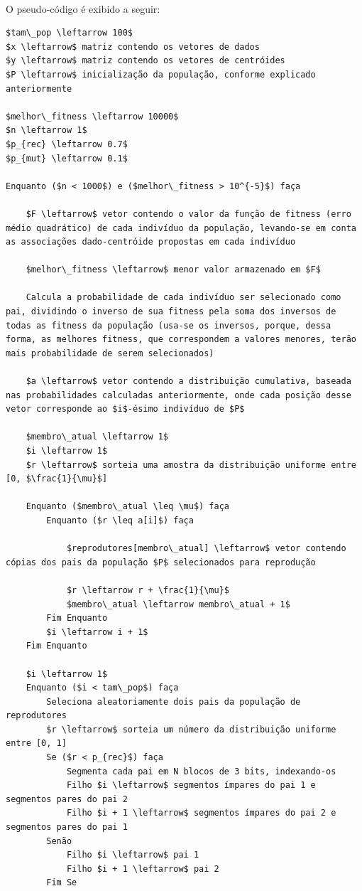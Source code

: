 \documentclass{report}
\begin{document}
\paragraph{} O pseudo-código é exibido a seguir:\\

\begin{lstlisting}[style=pseudo-codigo]
$tam\_pop \leftarrow 100$
$x \leftarrow$ matriz contendo os vetores de dados
$y \leftarrow$ matriz contendo os vetores de centróides
$P \leftarrow$ inicialização da população, conforme explicado anteriormente

$melhor\_fitness \leftarrow 10000$
$n \leftarrow 1$
$p_{rec} \leftarrow 0.7$
$p_{mut} \leftarrow 0.1$

Enquanto ($n < 1000$) e ($melhor\_fitness > 10^{-5}$) faça
	
	$F \leftarrow$ vetor contendo o valor da função de fitness (erro médio quadrático) de cada indivíduo da população, levando-se em conta as associações dado-centróide propostas em cada indivíduo
	
	$melhor\_fitness \leftarrow$ menor valor armazenado em $F$
	
	Calcula a probabilidade de cada indivíduo ser selecionado como pai, dividindo o inverso de sua fitness pela soma dos inversos de todas as fitness da população (usa-se os inversos, porque, dessa forma, as melhores fitness, que correspondem a valores menores, terão mais probabilidade de serem selecionados)
	
	$a \leftarrow$ vetor contendo a distribuição cumulativa, baseada nas probabilidades calculadas anteriormente, onde cada posição desse vetor corresponde ao $i$-ésimo indivíduo de $P$	
	
	$membro\_atual \leftarrow 1$
	$i \leftarrow 1$
	$r \leftarrow$ sorteia uma amostra da distribuição uniforme entre [0, $\frac{1}{\mu}$]
	
	Enquanto ($membro\_atual \leq \mu$) faça
		Enquanto ($r \leq a[i]$) faça
			
			$reprodutores[membro\_atual] \leftarrow$ vetor contendo cópias dos pais da população $P$ selecionados para reprodução
			
			$r \leftarrow r + \frac{1}{\mu}$
			$membro\_atual \leftarrow membro\_atual + 1$
		Fim Enquanto
		$i \leftarrow i + 1$
	Fim Enquanto
	
	$i \leftarrow 1$
	Enquanto ($i < tam\_pop$) faça
		Seleciona aleatoriamente dois pais da população de reprodutores
		$r \leftarrow$ sorteia um número da distribuição uniforme entre [0, 1]
		Se ($r < p_{rec}$) faça
			Segmenta cada pai em N blocos de 3 bits, indexando-os
			Filho $i \leftarrow$ segmentos ímpares do pai 1 e segmentos pares do pai 2
			Filho $i + 1 \leftarrow$ segmentos ímpares do pai 2 e segmentos pares do pai 1
		Senão
			Filho $i \leftarrow$ pai 1
			Filho $i + 1 \leftarrow$ pai 2
		Fim Se
		

\end{lstlisting}
\end{document}
